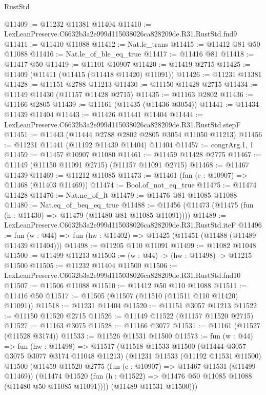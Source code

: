 \begin{lexlean}{RustStd}
\begin{coremodule}
@11409 := @11232 @11381 @11404
@11410 := LexLeanPreserve.C6632b3a2e999d115038026ca828209de.R31.RustStd.fnd9
@11411 := @11410 @11088
@11412 := Nat.le_trans
@11415 := @11412 @81 @50 @11088
@11416 := Nat.le_of_ble_eq_true
@11417 := @11416 @81
@11418 := @11417 @50
@11419 := @11101 @10907
@11420 := @11419 @2715
@11425 := @11409 (@11411 (@11415 (@11418 @11420) @11091))
@11426 := @11231 @11381
@11428 := @11151 @2788 @11213
@11430 := @11150 @11428 @2715
@11434 := @11149 @11430 (@11157 @11428 @2715)
@11435 := @11163 @2802
@11436 := @11166 @2805
@11439 := @11161 (@11435 (@11436 @3054))
@11441 := @11434 @11439 @11404
@11443 := @11426 @11441 @11404
@11444 := LexLeanPreserve.C6632b3a2e999d115038026ca828209de.R31.RustStd.stepF
@11451 := @11443 (@11444 @2788 @2802 @2805 @3054 @11050 @11213)
@11456 := @11231 @11441 (@11192 @11439 @11404) @11404
@11457 := congrArg.{1, 1}
@11459 := @11457 @10907 @11080
@11461 := @11459 @11428 @2775
@11467 := @11149 (@11150 @11091 @2715) (@11157 @11091 @2715)
@11468 := @11467 @11439
@11469 := @11212 @11085
@11473 := @11461 (fun (c : @10907) => @11468 (@11403 @11469))
@11474 := Bool.of_not_eq_true
@11475 := @11474 @11428
@11476 := Nat.ne_of_lt
@11479 := @11476 @81 @11085 @11088
@11480 := Nat.eq_of_beq_eq_true
@11488 := @11456 (@11473 (@11475 (fun (h : @11430) => @11479 (@11480 @81 @11085 @11091))))
@11489 := LexLeanPreserve.C6632b3a2e999d115038026ca828209de.R31.RustStd.iteF
@11496 := fun (w : @44) => fun (hw : @11402) => @11425 (@11451 (@11488 (@11489 @11439 @11404)))
@11498 := @11205 @110 @11091
@11499 := @11082 @11048
@11500 := @11499 @11213
@11503 := (w : @44) -> (hw : @11498) -> @11215 @11500
@11505 := @11232 @11404 @11500
@11506 := LexLeanPreserve.C6632b3a2e999d115038026ca828209de.R31.RustStd.fnd10
@11507 := @11506 @11088
@11510 := @11412 @50 @110 @11088
@11511 := @11416 @50
@11517 := @11505 (@11507 (@11510 (@11511 @110 @11420) @11091))
@11518 := @11231 @11404
@11520 := @11151 @3057 @11213
@11522 := @11150 @11520 @2715
@11526 := @11149 @11522 (@11157 @11520 @2715)
@11527 := @11163 @3075
@11528 := @11166 @3077
@11531 := @11161 (@11527 (@11528 @3174))
@11533 := @11526 @11531 @11500
@11573 := fun (w : @44) =>
  fun (hw : @11498) =>
  @11517
    (@11518
      @11533
      @11500
      (@11444 @3057 @3075 @3077 @3174 @11048 @11213)
      (@11231
        @11533
        (@11192 @11531 @11500)
        @11500
        (@11459
          @11520
          @2775
          (fun (c : @10907) => @11467 @11531 (@11499 @11469))
          (@11474 @11520 (fun (h : @11522) => @11476 @50 @11085 @11088 (@11480 @50 @11085 @11091))))
        (@11489 @11531 @11500)))

\end{coremodule}
\end{lexlean}
